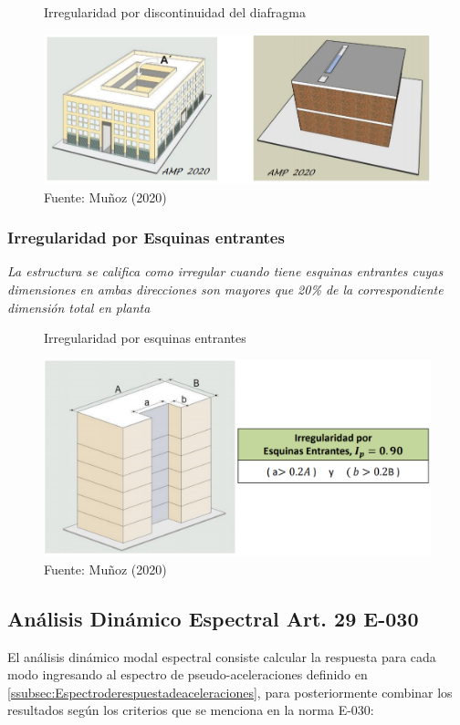 \documentclass{article}%
\begin{document}
\begin{figure}[H]%
\centering%
\caption{Irregularidad por discontinuidad del diafragma}%
\includegraphics[scale=0.7]{images/i_diafragma.PNG}%
\caption*{\small Fuente: Muñoz (2020)}%
\end{figure}

%
\subsubsection{Irregularidad por Esquinas entrantes}%
\label{ssubsec:IrregularidadporEsquinasentrantes}%
\begin{tcolorbox}[colback=gray!5!white,colframe=cyan!75!black,fonttitle=\bfseries,title=Tabla N°9 E-030]%
\textit{La estructura se califica como irregular cuando tiene esquinas entrantes  cuyas  dimensiones  en  ambas  direcciones  son mayores que 20\% de la correspondiente dimensión total en planta}%
\end{tcolorbox}%


\begin{figure}[H]%
\centering%
\caption{Irregularidad por esquinas entrantes}%
\includegraphics[scale=0.5]{images/i_esquinas.PNG}%
\caption*{\small Fuente: Muñoz (2020)}%
\end{figure}

%
\subsection{Análisis Dinámico Espectral Art. 29 E{-}030}%
\label{subsec:AnlisisDinmicoEspectralArt.29E{-}030}%
El análisis dinámico modal espectral consiste calcular la respuesta para cada modo ingresando al espectro de pseudo-aceleraciones definido en \ref{ssubsec:Espectroderespuestadeaceleraciones}, para posteriormente combinar los resultados según los criterios que se menciona en la norma E-030:%
\end{document}
